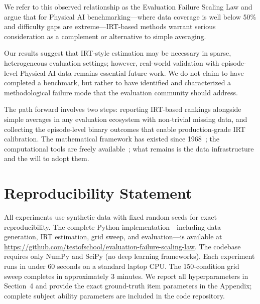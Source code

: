 \documentclass[11pt,a4paper]{article}
\begin{document}
We refer to this observed relationship as the Evaluation Failure Scaling Law and argue that for Physical AI benchmarking---where data coverage is well below 50\% and difficulty gaps are extreme---IRT-based methods warrant serious consideration as a complement or alternative to simple averaging.

Our results suggest that IRT-style estimation may be necessary in sparse, heterogeneous evaluation settings; however, real-world validation with episode-level Physical AI data remains essential future work. We do not claim to have completed a benchmark, but rather to have identified and characterized a methodological failure mode that the evaluation community should address.

The path forward involves two steps: reporting IRT-based rankings alongside simple averages in any evaluation ecosystem with non-trivial missing data, and collecting the episode-level binary outcomes that enable production-grade IRT calibration. The mathematical framework has existed since 1968~\cite{lord1968}; the computational tools are freely available~\cite{lalor2022,rodriguez2021b}; what remains is the data infrastructure and the will to adopt them.

\section*{Reproducibility Statement}

All experiments use synthetic data with fixed random seeds for exact reproducibility. The complete Python implementation---including data generation, IRT estimation, grid sweep, and evaluation---is available at \url{https://github.com/testofschool/evaluation-failure-scaling-law}. The codebase requires only NumPy and SciPy (no deep learning frameworks). Each experiment runs in under 60 seconds on a standard laptop CPU. The 150-condition grid sweep completes in approximately 3 minutes. We report all hyperparameters in Section~4 and provide the exact ground-truth item parameters in the Appendix; complete subject ability parameters are included in the code repository.


\end{document}
